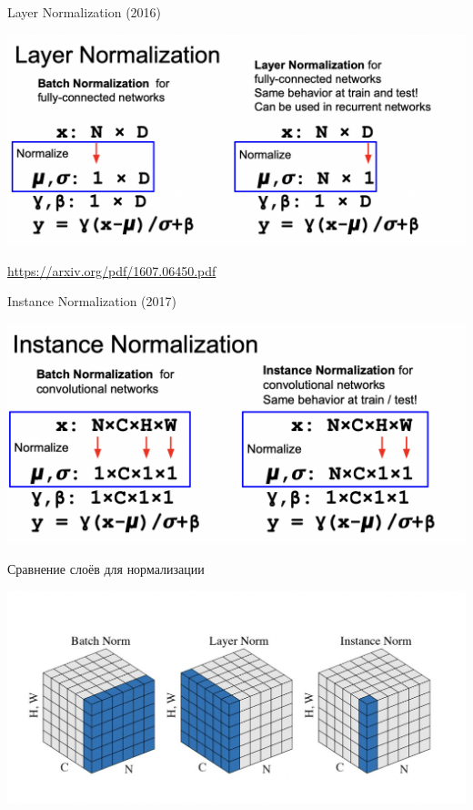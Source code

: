\documentclass[notes,12pt, aspectratio=169]{beamer}
\begin{document}
\begin{frame}{Layer Normalization (2016)}

\begin{center}
	\includegraphics[width=.95\linewidth]{st_norm_2.png}
\end{center}
	\vfill %
\footnotesize
{\color{blue} \url{https://arxiv.org/pdf/1607.06450.pdf}}
\end{frame}


\begin{frame}{Instance Normalization (2017)}
\begin{center}
	\includegraphics[width=.95\linewidth]{st_norm_3.png}
\end{center}
\end{frame}


\begin{frame}{Сравнение слоёв для нормализации}
\begin{center}
	\includegraphics[width=.95\linewidth]{st_norm_4.png}
\end{center}
\end{frame}
\end{document}
